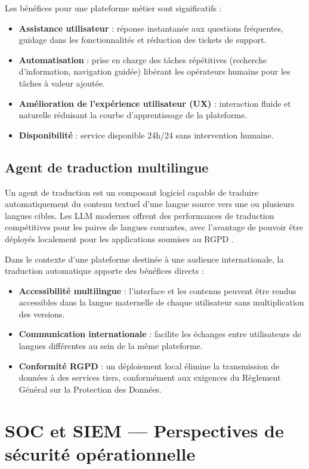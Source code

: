 Les bénéfices pour une plateforme métier sont significatifs :
\begin{itemize}
    \item \textbf{Assistance utilisateur} : réponse instantanée aux questions fréquentes, guidage dans les fonctionnalités et réduction des tickets de support.
    \item \textbf{Automatisation} : prise en charge des tâches répétitives (recherche d'information, navigation guidée) libérant les opérateurs humains pour les tâches à valeur ajoutée.
    \item \textbf{Amélioration de l'expérience utilisateur (UX)} : interaction fluide et naturelle réduisant la courbe d'apprentissage de la plateforme.
    \item \textbf{Disponibilité} : service disponible 24h/24 sans intervention humaine.
\end{itemize}

\subsection{Agent de traduction multilingue}
Un agent de traduction est un composant logiciel capable de traduire automatiquement du contenu textuel d'une langue source vers une ou plusieurs langues cibles. Les LLM modernes offrent des performances de traduction compétitives pour les paires de langues courantes, avec l'avantage de pouvoir être déployés localement pour les applications soumises au RGPD \cite{rgpd}.

Dans le contexte d'une plateforme destinée à une audience internationale, la traduction automatique apporte des bénéfices directs :
\begin{itemize}
    \item \textbf{Accessibilité multilingue} : l'interface et les contenus peuvent être rendus accessibles dans la langue maternelle de chaque utilisateur sans multiplication des versions.
    \item \textbf{Communication internationale} : facilite les échanges entre utilisateurs de langues différentes au sein de la même plateforme.
    \item \textbf{Conformité RGPD} : un déploiement local élimine la transmission de données à des services tiers, conformément aux exigences du Règlement Général sur la Protection des Données.
\end{itemize}

\section{SOC et SIEM — Perspectives de sécurité opérationnelle}

